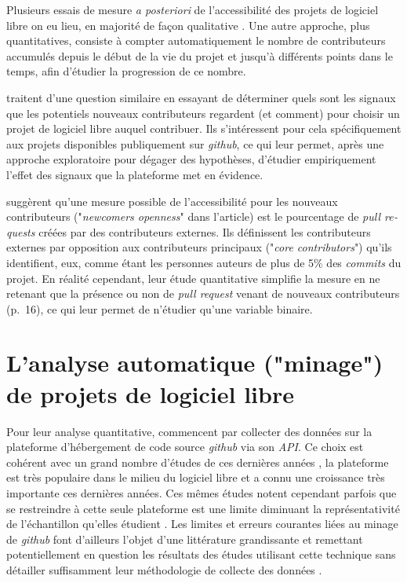 \documentclass[dvipsnames,runningheads]{llncs}
\newcommand{\en}[1]{\foreignlanguage{english}{\emph{#1}}}
\begin{document}
    \label{sec:accessibility-measure}
    Plusieurs essais de mesure \emph{a posteriori} de l'accessibilité des projets de logiciel libre on eu
    lieu, en majorité de façon qualitative
    \parencites{newcomers-accessibility-2016}{newcomers-onboarding-2018}[voir
    aussi][]{newcomers-adaptation-2005}. Une autre approche, plus quantitatives, consiste à compter
    automatiquement le nombre de contributeurs accumulés depuis le début de la vie du projet et jusqu'à
    différents points dans le temps, afin d'étudier la progression de ce nombre\cite{contributor-count-2006}.

    \textcite{signals-2019} traitent d'une question similaire en essayant de déterminer quels sont les signaux
    que les potentiels nouveaux contributeurs regardent (et comment) pour choisir un projet de logiciel libre
    auquel contribuer. Ils s'intéressent pour cela spécifiquement aux projets disponibles publiquement sur
    \en{github}, ce qui leur permet, après une approche exploratoire pour dégager des hypothèses, d'étudier
    empiriquement l'effet des signaux que la plateforme met en évidence.

    \textcite{signals-2019} suggèrent qu'une mesure possible de l'accessibilité pour les nouveaux
    contributeurs ("\en{newcomers openness}" dans l'article) est le pourcentage de \en{pull requests} créées
    par des contributeurs externes. Ils définissent les contributeurs externes par opposition aux
    contributeurs principaux ("\en{core contributors}") qu'ils identifient, eux, comme étant les personnes
    auteurs de plus de 5\% des \en{commits} du projet. En réalité cependant, leur étude quantitative simplifie
    la mesure en ne retenant que la présence ou non de \en{pull request} venant de nouveaux contributeurs
    (p.~16), ce qui leur permet de n'étudier qu'une variable binaire.

    \section{L'analyse automatique ("minage") de projets de logiciel libre}

    Pour leur analyse quantitative, \textcite{signals-2019} commencent par collecter des données sur la
    plateforme d'hébergement de code source \en{github} via son \en{API}. Ce choix est cohérent avec un grand
    nombre d'études de ces dernières années \parencite{github-mapping-2017}, la plateforme est très populaire
    dans le milieu du logiciel libre et a connu une croissance très importante ces dernières années. Ces mêmes
    études notent cependant parfois que se restreindre à cette seule plateforme est une limite diminuant la
    représentativité de l'échantillon qu'elles étudient \parencite{swh-growth-2019}. Les limites et erreurs
    courantes liées au minage de \en{github} font d'ailleurs l'objet d'une littérature grandissante et
    remettant potentiellement en question les résultats des études utilisant cette technique sans détailler
    suffisamment leur méthodologie de collecte des données \parencite{mining-github-2014,penumbra-oss-2022}.
\end{document}
